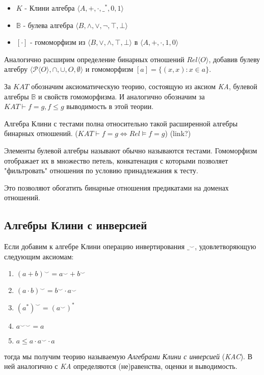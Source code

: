 \documentclass[times
              ]{itmo-student-thesis}
\begin{document}
      \begin{itemize}
        \item $K$ - Клини алгебра $\langle A, +, \cdot, \_^*, 0, 1 \rangle $
        \item $\mathbb{B}$ - булева алгебра $\langle B, \wedge, \vee, \neg, \top, \bot \rangle $
        \item $[\cdot]$ - гомоморфизм из
          $\langle B, \vee, \wedge, \top, \bot \rangle$
        в $\langle A, +,     \cdot, 1,    0 \rangle$
      \end{itemize}

      Аналогично расширим определение бинарных отношений $Rel \langle O \rangle $, добавив булеву алгебру $\langle \mathcal{P}\langle O \rangle, \cap, \cup, O, \emptyset \rangle$ и гомоморфизм $ [a] = \{(x, x): x \in a\} $.

      За $ \mathit{KAT} $ обозначим аксиоматическую теорию, состоящую из аксиом \textit{KA}, булевой алгебры $ \mathbb{B}$ и свойств гомоморфизма. И аналогично обозначим за $ KAT \vdash f = g, f \leq g $ выводимость в этой теории.

      Алгебра Клини с тестами полна относительно такой расширенной алгебры бинарных отношений.
      ($\mathit{KAT} \vdash f = g \Leftrightarrow \mathit{Rel} \models f = g$) (link?)

      Элементы булевой алгебры называют обычно называются тестами.
      Гомоморфизм отображает их в множество петель, конкатенация с которыми позволяет "фильтровать" отношения по условию принадлежания к тесту.

      Это позволяют обогатить бинарные отношения предикатами на доменах отношений.

    \subsection{Алгебры Клини с инверсией}
      Если добавим к алгебре Клини операцию инвертирования $ \_^{\smile} $, удовлетворяющую следующим аксиомам:
      \begin{enumerate}
        \item $ (a + b)^{\smile} = a^{\smile} + b^{\smile} $
        \item $ (a \cdot b)^{\smile} = b^{\smile} \cdot a^{\smile} $
        \item $ (a^*)^{\smile} = (a^{\smile})^* $
        \item $ {a^{\smile}}^{\smile} = a $
        \item $ a \leq a \cdot a^{\smile} \cdot a $
      \end{enumerate}
    тогда мы получим теорию называемую \textit{Алгебрами Клини с инверсией} (\textit{KAC}).
    В ней аналогично с \textit{KA} определяются (не)равенства, оценки и выводимость.
\end{document}
